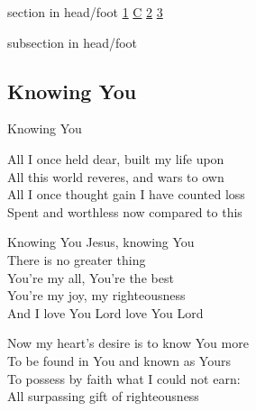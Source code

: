 \documentclass{beamer}
\begin{document}
{
{ 
 {
 \begin{beamercolorbox}[ht=4.5ex,dp=1.5ex,%
      leftskip=.3cm,rightskip=.3cm plus1fil]{section in head/foot}
 \fontsize{12}{25}\selectfont 
\hyperlink{Knowing You['All I once held dear']1}{1}
\hyperlink{Knowing You['All I once held dear']C}{C}
\hyperlink{Knowing You['All I once held dear']2}{2}
\hyperlink{Knowing You['All I once held dear']3}{3}
 
 \end{beamercolorbox}%
  \begin{beamercolorbox}[ht=2.5ex,dp=1.125ex,%
   leftskip=.3cm,rightskip=.3cm plus1fil]{subsection in head/foot}
   \insertauthor
 \end{beamercolorbox}%
 }
}
\subsection{ Knowing You }

\hypertarget{Knowing You['All I once held dear']1}{}
\begin{frame}{Knowing You }
\fontsize{ 18 }{ 23 }\selectfont

All I once held dear, built my life upon\\ 
All this world reveres, and wars to own\\ 
All I once thought gain I have counted loss\\ 
Spent and worthless now compared to this 

\end{frame}

\hypertarget{Knowing You['All I once held dear']C}{}
\begin{frame}{}
\fontsize{ 18 }{ 23 }\selectfont

Knowing You Jesus, knowing You\\ 
There is no greater thing\\ 
You're my all, You're the best\\ 
You're my joy, my righteousness\\ 
And I love You Lord love You Lord 

\end{frame}

\hypertarget{Knowing You['All I once held dear']2}{}
\begin{frame}{}
\fontsize{ 18 }{ 23 }\selectfont

Now my heart's desire is to know You more\\ 
To be found in You and known as Yours\\ 
To possess by faith what I could not earn:\\ 
All surpassing gift of righteousness 


\end{frame}}
\end{document}
